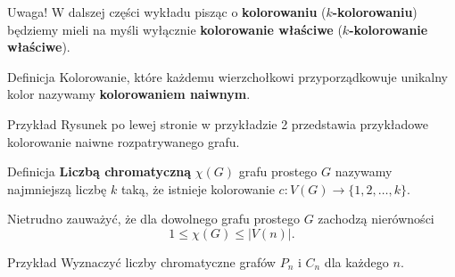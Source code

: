 \documentclass[a4paper,10pt]{beamer}
\begin{document}
\begin{frame}
	\begin{alertblock}{Uwaga!}
		W dalszej części wykładu pisząc o {\bf kolorowaniu} ({\bf $k$-kolorowaniu}) będziemy mieli na myśli wyłącznie {\bf kolorowanie właściwe} ({\bf $k$-kolorowanie właściwe}).
	\end{alertblock}

\bigskip

\begin{block}{Definicja}
Kolorowanie, które każdemu wierzchołkowi przyporządkowuje unikalny kolor nazywamy {\bf kolorowaniem naiwnym}.
\end{block}

\bigskip

\begin{exampleblock}{Przykład}
Rysunek po lewej stronie w przykładzie 2 przedstawia przykładowe kolorowanie naiwne rozpatrywanego grafu. 
\end{exampleblock}
	
\end{frame}





\begin{frame}
	
	\begin{block}{Definicja}
		{\bf Liczbą chromatyczną} $\chi(G)$ grafu prostego $G$ nazywamy najmniejszą liczbę $k$ taką, że istnieje kolorowanie $c:V(G)\to\{1,2,\ldots,k\}$.
	\end{block}

\medskip

	Nietrudno zauważyć, że dla dowolnego grafu prostego $G$ zachodzą nierówności
	$$1\leq \chi(G)\leq |V(n)|.$$

\medskip

	\begin{exampleblock}{Przykład}
		Wyznaczyć liczby chromatyczne grafów $P_n$ i $C_n$ dla każdego $n$.
	\end{exampleblock}

\end{frame}
\end{document}
